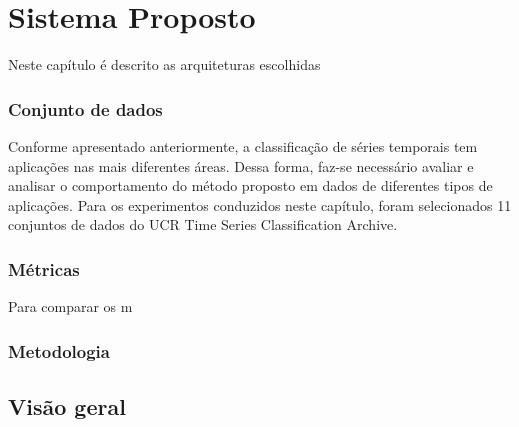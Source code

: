 \chapter{Sistema Proposto} \label{cap3}

Neste capítulo é descrito as arquiteturas escolhidas 


\subsection{Conjunto de dados}

Conforme apresentado anteriormente, a classificação de séries temporais tem aplicações nas mais diferentes áreas. Dessa forma, faz-se necessário avaliar e analisar o comportamento do método proposto em dados de diferentes tipos de aplicações. Para os experimentos conduzidos neste capítulo, foram selecionados 11 conjuntos de dados do UCR Time Series Classification Archive\cite{UCRArchive}. 

\subsection{Métricas}
Para comparar os m
\subsection{Metodologia}


\section{Visão geral}



